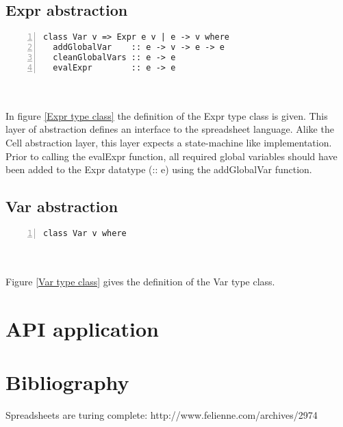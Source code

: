 \documentclass[10pt,a4paper]{article}
\begin{document}
\subsection{Expr abstraction}
\label{Expr abstraction}
\begin{minipage}{\linewidth}
\begin{Verbatim}[numbers=left,stepnumber=1,numbersep=5pt]
class Var v => Expr e v | e -> v where
  addGlobalVar    :: e -> v -> e -> e
  cleanGlobalVars :: e -> e
  evalExpr        :: e -> e
\end{Verbatim}
\label{Expr type class}
\end{minipage}
\\\\
In figure \ref{Expr type class} the definition of the Expr type class is given. This layer
of abstraction defines an interface to the spreadsheet language. Alike the Cell abstraction layer,
this layer expects a state-machine like implementation. Prior to calling the evalExpr function,
all required global variables should have been added to the Expr datatype (:: e) using the
addGlobalVar function.

\subsection{Var abstraction}
\label{Var abstraction}
\begin{minipage}{\linewidth}
\begin{Verbatim}[numbers=left,stepnumber=1,numbersep=5pt]
class Var v where
\end{Verbatim}
\label{Var type class}
\end{minipage}
\\\\
Figure \ref{Var type class} gives the definition of the Var type class.

\section{API application}
\label{API application}


\section*{Bibliography}
Spreadsheets are turing complete: http://www.felienne.com/archives/2974
\end{document}
